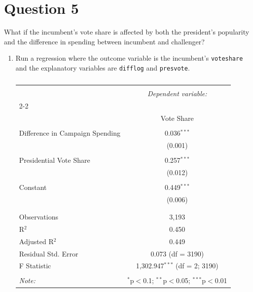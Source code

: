 \documentclass[12pt,letterpaper]{article}
\begin{document}
\section*{Question 5}
\noindent What if the incumbent's vote share is affected by both the president's popularity and the difference in spending between incumbent and challenger? 
	\begin{enumerate}
		\item Run a regression where the outcome variable is the incumbent's \texttt{voteshare} and the explanatory variables are \texttt{difflog} and \texttt{presvote}.
		
		\begin{table}[!htbp] \centering 
			\caption{} 
			\label{} 
			\begin{tabular}{@{\extracolsep{5pt}}lc} 
				\\[-1.8ex]\hline 
				\hline \\[-1.8ex] 
				& \multicolumn{1}{c}{\textit{Dependent variable:}} \\ 
				\cline{2-2} 
				\\[-1.8ex] & Vote Share \\ 
				\hline \\[-1.8ex] 
				Difference in Campaign Spending & 0.036$^{***}$ \\ 
				& (0.001) \\ 
				& \\ 
				Presidential Vote Share & 0.257$^{***}$ \\ 
				& (0.012) \\ 
				& \\ 
				Constant & 0.449$^{***}$ \\ 
				& (0.006) \\ 
				& \\ 
				\hline \\[-1.8ex] 
				Observations & 3,193 \\ 
				R$^{2}$ & 0.450 \\ 
				Adjusted R$^{2}$ & 0.449 \\ 
				Residual Std. Error & 0.073 (df = 3190) \\ 
				F Statistic & 1,302.947$^{***}$ (df = 2; 3190) \\ 
				\hline 
				\hline \\[-1.8ex] 
				\textit{Note:}  & \multicolumn{1}{r}{$^{*}$p$<$0.1; $^{**}$p$<$0.05; $^{***}$p$<$0.01} \\ 
			\end{tabular} 
		\end{table}	

\end{enumerate}
\end{document}
